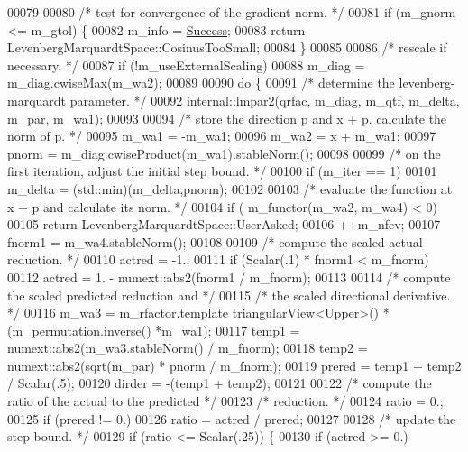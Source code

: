 \begin{DoxyCode}
00079 
00080   \textcolor{comment}{/* test for convergence of the gradient norm. */}
00081   \textcolor{keywordflow}{if} (m\_gnorm <= m\_gtol) \{
00082     m\_info = \hyperlink{group__enums_gga85fad7b87587764e5cf6b513a9e0ee5ea52581b035f4b59c203b8ff999ef5fcea}{Success};
00083     \textcolor{keywordflow}{return} LevenbergMarquardtSpace::CosinusTooSmall;
00084   \}
00085 
00086   \textcolor{comment}{/* rescale if necessary. */}
00087   \textcolor{keywordflow}{if} (!m\_useExternalScaling)
00088       m\_diag = m\_diag.cwiseMax(m\_wa2);
00089 
00090   \textcolor{keywordflow}{do} \{
00091     \textcolor{comment}{/* determine the levenberg-marquardt parameter. */}
00092     internal::lmpar2(qrfac, m\_diag, m\_qtf, m\_delta, m\_par, m\_wa1);
00093 
00094     \textcolor{comment}{/* store the direction p and x + p. calculate the norm of p. */}
00095     m\_wa1 = -m\_wa1;
00096     m\_wa2 = x + m\_wa1;
00097     pnorm = m\_diag.cwiseProduct(m\_wa1).stableNorm();
00098 
00099     \textcolor{comment}{/* on the first iteration, adjust the initial step bound. */}
00100     \textcolor{keywordflow}{if} (m\_iter == 1)
00101         m\_delta = (std::min)(m\_delta,pnorm);
00102 
00103     \textcolor{comment}{/* evaluate the function at x + p and calculate its norm. */}
00104     \textcolor{keywordflow}{if} ( m\_functor(m\_wa2, m\_wa4) < 0)
00105         \textcolor{keywordflow}{return} LevenbergMarquardtSpace::UserAsked;
00106     ++m\_nfev;
00107     fnorm1 = m\_wa4.stableNorm();
00108 
00109     \textcolor{comment}{/* compute the scaled actual reduction. */}
00110     actred = -1.;
00111     \textcolor{keywordflow}{if} (Scalar(.1) * fnorm1 < m\_fnorm)
00112         actred = 1. - numext::abs2(fnorm1 / m\_fnorm);
00113 
00114     \textcolor{comment}{/* compute the scaled predicted reduction and */}
00115     \textcolor{comment}{/* the scaled directional derivative. */}
00116     m\_wa3 = m\_rfactor.template triangularView<Upper>() * (m\_permutation.inverse() *m\_wa1);
00117     temp1 = numext::abs2(m\_wa3.stableNorm() / m\_fnorm);
00118     temp2 = numext::abs2(sqrt(m\_par) * pnorm / m\_fnorm);
00119     prered = temp1 + temp2 / Scalar(.5);
00120     dirder = -(temp1 + temp2);
00121 
00122     \textcolor{comment}{/* compute the ratio of the actual to the predicted */}
00123     \textcolor{comment}{/* reduction. */}
00124     ratio = 0.;
00125     \textcolor{keywordflow}{if} (prered != 0.)
00126         ratio = actred / prered;
00127 
00128     \textcolor{comment}{/* update the step bound. */}
00129     \textcolor{keywordflow}{if} (ratio <= Scalar(.25)) \{
00130         \textcolor{keywordflow}{if} (actred >= 0.)

\end{DoxyCode}
